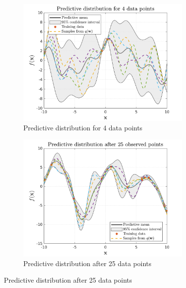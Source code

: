 \begin{figure}[H]    
  \begin{subfigure}[b]{0.48\linewidth}
    \centering
    \includegraphics[height=0.18\textheight,width=0.95\textwidth]{Chapter3/Figures/func_uncertainty_1.png} 
    \caption{Predictive distribution for 4 data points} 
    \label{Fig:Re-pred-4-points} 
  \end{subfigure} 
  \hspace{\fill}  %
  \begin{subfigure}[b]{0.48\linewidth}
    \centering
    \includegraphics[height=0.18\textheight,width=0.95\textwidth]{Chapter3/Figures/func_uncertainty_2.png} 
    \caption{Predictive distribution after 25 data points} 
    \label{Fig:Re-pred-25-points}
  \end{subfigure} 


\end{figure}
